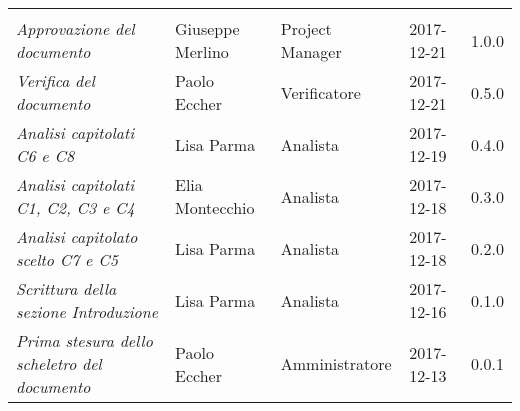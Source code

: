 \newpage 
\section*{}
\begin{table}[H]
	\centering
	\begin{tabular}{p{4cm}|C{3cm}|C{3cm}|R{2.5cm}|R{2cm}}
		
		 & & & & \\
		
		
		\emph{Approvazione del documento} & Giuseppe Merlino & Project Manager & 2017-12-21 & 1.0.0 \\
		\hline
		
		\emph{Verifica del documento} & Paolo Eccher & Verificatore & 2017-12-21 & 0.5.0 \\
		\hline
		
		\emph{Analisi capitolati C6 e C8 } & Lisa Parma & Analista & 2017-12-19 & 0.4.0 \\
		\hline
		
		\emph{Analisi capitolati C1, C2, C3 e C4 } & Elia Montecchio & Analista & 2017-12-18 & 0.3.0 \\
		\hline
		
		\emph{Analisi capitolato scelto C7 e C5 } & Lisa Parma & Analista & 2017-12-18 & 0.2.0 \\
		\hline
		
		\emph{Scrittura della sezione Introduzione } & Lisa Parma & Analista & 2017-12-16 & 0.1.0 \\
		\hline
		
		\emph{Prima stesura dello scheletro del documento} & Paolo Eccher & Amministratore & 2017-12-13 & 0.0.1 \\
		
	\end{tabular}
	
\end{table}


\clearpage
